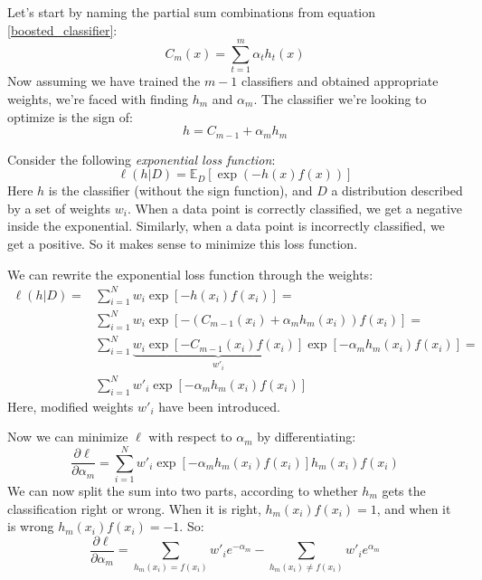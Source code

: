 \documentclass[12pt, a4paper]{article}
\numberwithin{equation}{section}
\begin{document}
Let's start by naming the partial sum combinations from equation \ref{boosted_classifier}:
\begin{equation}
C_m(x)=\sum_{t=1}^m \alpha_t h_t(x)
\end{equation}
Now assuming we have trained the $m-1$ classifiers and obtained appropriate weights, we're faced with finding $h_m$ and $\alpha_m$. The classifier we're looking to optimize is the sign of:
\begin{equation}
h=C_{m-1}+\alpha_m h_m
\label{cm_definition}
\end{equation}

Consider the following \textit{exponential loss function}:
\begin{equation}
\ell(h|D)=\mathbb{E}_D\left[\exp(-h(x)f(x))\right]
\end{equation}
Here $h$ is the classifier (without the sign function), and $D$ a distribution described by a set of weights $w_i$. When a data point is correctly classified, we get a negative inside the exponential. Similarly, when a data point is incorrectly classified, we get a positive. So it makes sense to minimize this loss function.

We can rewrite the exponential loss function through the weights:
\begin{align}
\ell(h|D)=&\sum_{i=1}^N w_i\exp[-h(x_i)f(x_i)]=\\
&\sum_{i=1}^N w_i\exp[-(C_{m-1}(x_i)+\alpha_m h_m(x_i))f(x_i)]=\\
&\sum_{i=1}^N\underbrace{w_i\exp[-C_{m-1}(x_i)f(x_i)]}_{w'_i}\exp[-\alpha_m h_m(x_i)f(x_i)]=\\
&\sum_{i=1}^N w'_i\exp[-\alpha_m h_m(x_i)f(x_i)]
\end{align}
Here, modified weights $w'_i$ have been introduced.

Now we can minimize $\ell$ with respect to $\alpha_m$ by differentiating:
\begin{equation}
\frac{\partial\ell}{\partial\alpha_m}=\sum_{i=1}^N w'_i\exp[-\alpha_m h_m(x_i)f(x_i)]h_m(x_i)f(x_i)
\end{equation}
We can now split the sum into two parts, according to whether $h_m$ gets the classification right or wrong. When it is right, $h_m(x_i)f(x_i)=1$, and when it is wrong $h_m(x_i)f(x_i)=-1$. So:
\begin{equation}
\frac{\partial\ell}{\partial\alpha_m}=\sum_{h_m(x_i)=f(x_i)}w'_i e^{-\alpha_m}-\sum_{h_m(x_i)\neq f(x_i)}w'_i e^{\alpha_m}
\end{equation}
\end{document}

